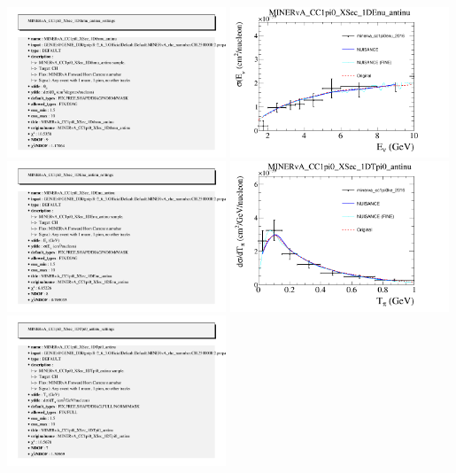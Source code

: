 \documentclass{article}
\begin{document}
\includegraphics[width=0.49\textwidth]{figures/minerva_cc1pi0angle_2016_info.png}
\centering
\includegraphics[width=0.49\textwidth]{figures/minerva_cc1pi0enu_2016_comp.png}
\includegraphics[width=0.49\textwidth]{figures/minerva_cc1pi0enu_2016_info.png}
\centering
\includegraphics[width=0.49\textwidth]{figures/minerva_cc1pi0ke_2016_comp.png}
\includegraphics[width=0.49\textwidth]{figures/minerva_cc1pi0ke_2016_info.png}
\end{document}
